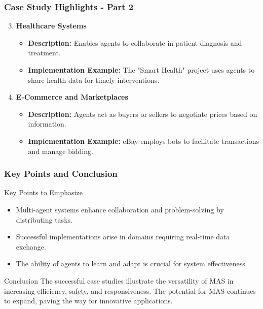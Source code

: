 \documentclass[aspectratio=169]{beamer}
\begin{document}
\begin{frame}[fragile]
    \frametitle{Case Study Highlights - Part 2}
    \begin{enumerate}
        \setcounter{enumi}{2} %
        \item \textbf{Healthcare Systems}
        \begin{itemize}
            \item \textbf{Description:} Enables agents to collaborate in patient diagnosis and treatment.
            \item \textbf{Implementation Example:} The "Smart Health" project uses agents to share health data for timely interventions.
        \end{itemize}

        \item \textbf{E-Commerce and Marketplaces}
        \begin{itemize}
            \item \textbf{Description:} Agents act as buyers or sellers to negotiate prices based on information.
            \item \textbf{Implementation Example:} eBay employs bots to facilitate transactions and manage bidding.
        \end{itemize}
    \end{enumerate}
\end{frame}

\begin{frame}[fragile]
    \frametitle{Key Points and Conclusion}
    \begin{block}{Key Points to Emphasize}
        \begin{itemize}
            \item Multi-agent systems enhance collaboration and problem-solving by distributing tasks.
            \item Successful implementations arise in domains requiring real-time data exchange.
            \item The ability of agents to learn and adapt is crucial for system effectiveness.
        \end{itemize}
    \end{block}

    \begin{block}{Conclusion}
        The successful case studies illustrate the versatility of MAS in increasing efficiency, safety, and responsiveness. The potential for MAS continues to expand, paving the way for innovative applications.
    \end{block}
\end{frame}
\end{document}
